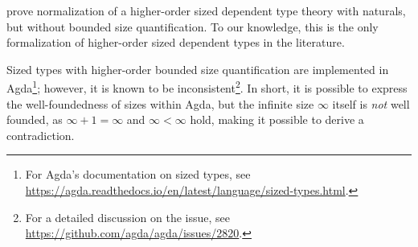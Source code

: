 \cite{nbe} prove normalization of a higher-order sized dependent type theory with naturals, but without bounded size quantification.
To our knowledge, this is the only formalization of higher-order sized dependent types in the literature.

Sized types with higher-order bounded size quantification are implemented in Agda\footnote{For Agda's documentation on sized types, see \url{https://agda.readthedocs.io/en/latest/language/sized-types.html}.};
however, it is known to be inconsistent\footnote{For a detailed discussion on the issue, see \url{https://github.com/agda/agda/issues/2820}.}.
In short, it is possible to express the well-foundedness of sizes within Agda,
but the infinite size $\infty$ itself is \emph{not} well founded,
as $\infty + 1 = \infty$ and $\infty < \infty$ hold,
making it possible to derive a contradiction.

